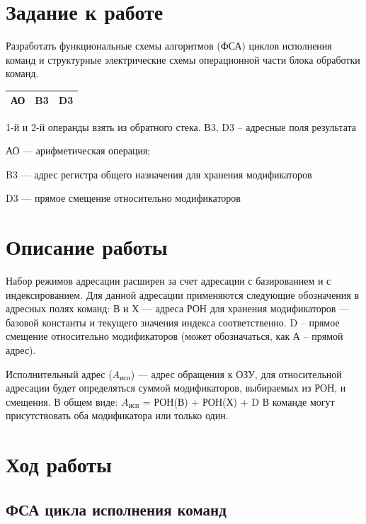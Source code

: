 \documentclass[a4paper,14pt]{extarticle}
\begin{document}
	\section*{Задание к работе}
Разработать функциональные схемы алгоритмов (ФСА) циклов исполнения команд и структурные электрические схемы операционной части блока обработки команд.
	
	\begin{center}
		\begin{tabular}{|c|c|c|}
			\hline
			АО & B3 &D3  \\
			\hline
		\end{tabular}
	\end{center}
	
	1-й и 2-й операнды взять из обратного стека. В3, D3 – адресные поля
	результата
	
	
	АО --- арифметическая операция;
	
	B3 --- адрес регистра общего назначения для хранения модификаторов
	
	D3 --- прямое смещение относительно модификаторов
	
	\section*{Описание работы}
	
	
	Набор режимов адресации расширен за счет адресации с базированием и с индексированием. Для данной адресации применяются следующие обозначения в
	адресных полях команд: В и Х --- адреса РОН для хранения модификаторов --- базовой константы и текущего значения индекса соответственно. D – прямое
	смещение относительно модификаторов (может обозначаться, как А – прямой
	адрес).
	
	Исполнительный адрес ($A_{исп}$) --- адрес обращения к ОЗУ, для относительной адресации будет определяться суммой модификаторов, выбираемых из
	РОН, и смещения. В общем виде:
	$A_{исп}$ = РОН(В) + РОН(Х) + D
	В команде могут присутствовать оба модификатора или только один.
	
	
	
	
	\section*{Ход работы}
	
	\subsection*{ФСА цикла исполнения команд}
	
\end{document}
